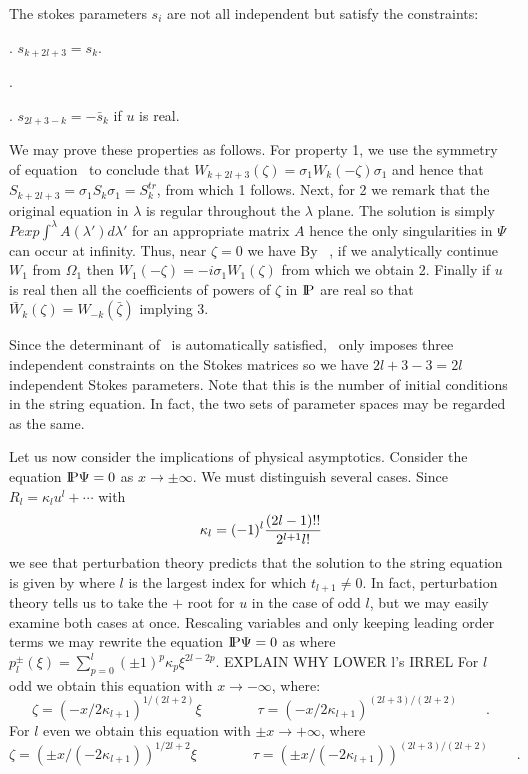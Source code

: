 The stokes parameters $s_i$ are not all independent but 
satisfy the constraints:

. $s_{k+2l+3}=s_k$.

. \eqn{}

. $s_{2l+3-k}=-\bar s_k$ if $u$ is real.

We may prove these properties as follows.
For property 1, we use
the symmetry of equation \dforz\ to conclude that
$W_{k+2l+3}(\zeta)=\sigma_1W_k(-\zeta)\sigma_1$ and hence that 
$S_{k+2l+3}=\sigma_1 S_k\sigma_1=S_k^{tr}$, from which 1 follows.
Next, for 2 we remark that the original 
equation in $\lambda$ is regular throughout the $\lambda$ plane.
The solution is simply $Pexp\int^\lambda A(\lambda')d\lambda'$ for
an appropriate matrix $A$ hence 
the only singularities in $\Psi$ can occur at infinity. Thus, near
$\zeta=0$ we have
\eqn{}
By
\nrzr\ , if we analytically continue $W_1$ from $\Omega_1$ then 
$W_1(-\zeta)=-i\sigma_1W_1(\zeta)$ from which we obtain 2. 
Finally if $u$ is real then all the coefficients of powers of 
$\zeta$ in $\relax{\rm I\kern-.18em P}$ are real so that $\bar W_k(\zeta)=W_{-k}(\bar\zeta)$
implying 3. 

Since the determinant of \mncnst\ is automatically satisfied, 
\mncnst\ only imposes three independent constraints on the 
Stokes matrices so
we have $2l+3-3=2l$ independent Stokes parameters.
Note that this is the number of initial conditions in the 
string equation. In fact, the two sets of parameter spaces 
may be regarded as the same.

Let us now consider the implications of physical asymptotics. 
Consider the equation $\relax{\rm I\kern-.18em P}\Psi=0$
as $x\to \pm\infty$. We must distinguish several cases.
Since $R_l=\kappa_l u^l +\cdots $ with 
$$\kappa_l=(-1)^l{(2l-1)!!\over 2^{l+1}l!}$$
we see that perturbation theory predicts that the solution to
the string equation is given by
\eqn{}
where $l$ is the largest index for which $t_{l+1}\not=0$. 
In fact, perturbation theory tells us to take the $+$ root for $u$ 
in the case of odd $l$, but we may easily examine both cases at once.
Rescaling variables and only keeping leading order terms we 
may rewrite the equation $\relax{\rm I\kern-.18em P} \Psi=0$ as
\eqn{}
where
$p_l^\pm(\xi)=\sum_{p=0}^l (\pm 1)^p\kappa_p\xi^{2l-2p}$.
EXPLAIN WHY LOWER l's IRREL
For $l$ odd we obtain this equation with $x\to -\infty$, 
where: 
$$\zeta=(-x/2\kappa_{l+1})^{1/(2l+2)}\xi \qquad\qquad 
\tau=(-x/2\kappa_{l+1})^{(2l+3)/(2l+2)}\qquad .$$ 
For $l$ even we obtain this equation with $\pm x\to +\infty$, where
$$\zeta=(\pm x/(-2\kappa_{l+1}))^{1/2l+2}\xi \qquad\qquad 
\tau=(\pm x/(-2\kappa_{l+1}))^{(2l+3)/(2l+2)}\qquad .$$

